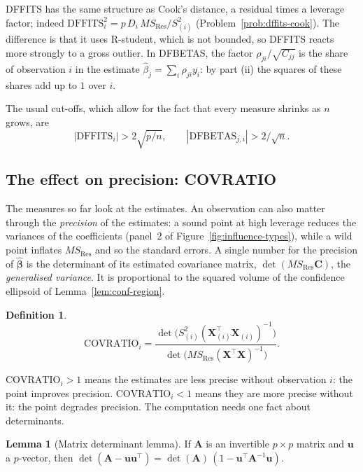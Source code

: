 \documentclass[11pt,a4paper]{article}
\numberwithin{equation}{section}
\theoremstyle{definition}
\newtheorem{defn}[thm]{Definition}
\newtheorem{lem}[thm]{Lemma}
\begin{document}
DFFITS has the same structure as Cook's distance, a residual times a leverage factor; indeed
$\mathrm{DFFITS}_i^2 = p\,D_i\,MS_{\mathrm{Res}}/S^2_{(i)}$ (Problem~\ref{prob:dffits-cook}).
The difference is that it uses R-student, which is not bounded, so DFFITS reacts more
strongly to a gross outlier. In DFBETAS, the factor $\rho_{ji}/\sqrt{C_{jj}}$ is the share of
observation $i$ in the estimate $\hat\beta_j = \sum_i \rho_{ji}y_i$: by part (ii) the squares of
these shares add up to $1$ over $i$.

The usual cut-offs, which allow for the fact that every measure shrinks as $n$ grows, are
\[
|\mathrm{DFFITS}_i| > 2\sqrt{p/n} ,
\qquad
|\mathrm{DFBETAS}_{j,i}| > 2/\sqrt{n} .
\]

\subsection{The effect on precision: COVRATIO}
The measures so far look at the estimates. An observation can also matter through the
\emph{precision} of the estimates: a sound point at high leverage reduces the variances of
the coefficients (panel~2 of Figure~\ref{fig:influence-types}), while a wild point inflates
$MS_{\mathrm{Res}}$ and so the standard errors. A single number for the precision of
$\hat{\boldsymbol\beta}$ is the determinant of its estimated covariance matrix,
$\det(MS_{\mathrm{Res}}\mathbf{C})$, the \emph{generalised variance}. It is proportional to the
squared volume of the confidence ellipsoid of Lemma~\ref{lem:conf-region}.

\begin{defn}
\[
\mathrm{COVRATIO}_i = \frac{\det\bigl(S^2_{(i)}(\mathbf{X}_{(i)}^\top\mathbf{X}_{(i)})^{-1}\bigr)}{\det\bigl(MS_{\mathrm{Res}}(\mathbf{X}^\top\mathbf{X})^{-1}\bigr)} .
\]
\end{defn}

$\mathrm{COVRATIO}_i > 1$ means the estimates are less precise without observation $i$: the
point improves precision. $\mathrm{COVRATIO}_i < 1$ means they are more precise without it: the
point degrades precision. The computation needs one fact about determinants.

\begin{lem}[Matrix determinant lemma]\label{lem:det}
If $\mathbf{A}$ is an invertible $p \times p$ matrix and $\mathbf{u}$ a $p$-vector, then
$\det(\mathbf{A} - \mathbf{u}\mathbf{u}^\top) = \det(\mathbf{A})\,(1 - \mathbf{u}^\top\mathbf{A}^{-1}\mathbf{u})$.
\end{lem}
\end{document}
